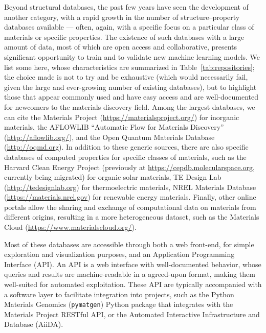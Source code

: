\documentclass[aip,apm,amsmath,amssymb,reprint]{revtex4-2}
\begin{document}
Beyond structural databases, the past few years have seen the development of another category, with a rapid growth in the number of structure–property databases available --- often, again, with a specific focus on a particular class of materials or specific properties. The existence of such databases with a large amount of data, most of which are open access and collaborative, presents significant opportunity to train and to validate new machine learning models. We list some here, whose characteristics are summarized in Table~\ref{tab:repositories}; the choice made is not to try and be exhaustive (which would necessarily fail, given the large and ever-growing number of existing databases), but to highlight those that appear commonly used and have easy access and are well-documented for newcomers to the materials discovery field. Among the largest databases, we can cite the Materials Project\cite{MaterialsProject} (\url{https://materialsproject.org/}) for inorganic materials, the AFLOWLIB\cite{AFLOW} ``Automatic Flow for Materials Discovery'' (\url{http://aflowlib.org/}), and the Open Quantum Materials Database\cite{OQMD} (\url{http://oqmd.org}). In addition to these generic sources, there are also specific databases of computed properties for specific classes of materials, such as the Harvard Clean Energy Project\cite{Hachmann2011} (previously at \url{https://cepdb.molecularspace.org}, currently being migrated) for organic solar materials, TE Design Lab\cite{Gorai2016} (\url{http://tedesignlab.org}) for thermoelectric materials, NREL Materials Database\cite{Stevanovic2012} (\url{https://materials.nrel.gov}) for renewable energy materials. Finally, other online portals allow the sharing and exchange of computational data on materials from different origins, resulting in a more heterogeneous dataset, such as the Materials Cloud\cite{MaterialsCloud} (\url{https://www.materialscloud.org/}).

Most of these databases are accessible through both a web front-end, for simple exploration and visualization purposes, and an Application Programming Interface (API). An API is a web interface with well-documented behavior, whose queries and results are machine-readable in a agreed-upon format, making them well-suited for automated exploitation. These API are typically accompanied with a software layer to facilitate integration into projects, such as the Python Materials Genomics (\texttt{pymatgen})\cite{Ong2013} Python package that integrates with the Materials Project RESTful API, or the Automated Interactive Infrastructure and Database (AiiDA).\cite{Pizzi2016}
\end{document}
